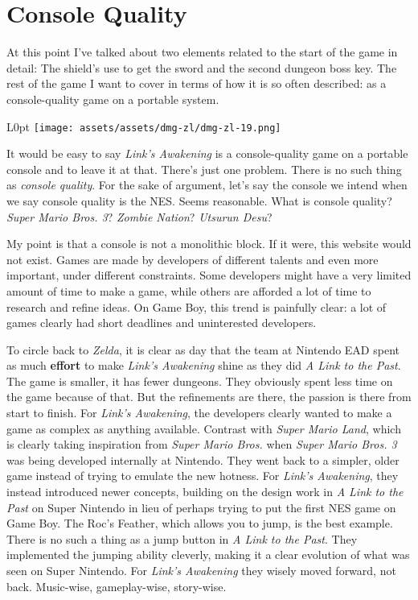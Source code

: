 \documentclass{book}
\begin{document}
\FloatBarrier\needspace{5pt}\section*{Console Quality}\nopagebreak[4]

At this point I’ve talked about two elements related to the start of the game in detail: The shield’s use to get the sword and the second dungeon boss key. The rest of the game I want to cover in terms of how it is so often described: as a console-quality game on a portable system.

\begin{wrapfigure}{L}{0pt} \texttt{[image: assets/assets/dmg-zl/dmg-zl-19.png]}\end{wrapfigure}
It would be easy to say \emph{Link’s Awakening} is a console-quality game on a portable console and to leave it at that. There’s just one problem. There is no such thing as \emph{console quality}. For the sake of argument, let’s say the console we intend when we say console quality is the NES. Seems reasonable. What is console quality? \emph{Super Mario Bros. 3}? \emph{Zombie Nation}? \emph{Utsurun Desu}?

My point is that a console is not a monolithic block. If it were, this website would not exist. Games are made by developers of different talents and even more important, under different constraints. Some developers might have a very limited amount of time to make a game, while others are afforded a lot of time to research and refine ideas. On Game Boy, this trend is painfully clear: a lot of games clearly had short deadlines and uninterested developers.

To circle back to \emph{Zelda}, it is clear as day that the team at Nintendo EAD spent as much \textbf{effort} to make \emph{Link’s Awakening} shine as they did \emph{A Link to the Past}. The game is smaller, it has fewer dungeons. They obviously spent less time on the game because of that. But the refinements are there, the passion is there from start to finish. For \emph{Link’s Awakening}, the developers clearly wanted to make a game as complex as anything available. Contrast with \emph{Super Mario Land}, which is clearly taking inspiration from \emph{Super Mario Bros.} when \emph{Super Mario Bros. 3} was being developed internally at Nintendo. They went back to a simpler, older game instead of trying to emulate the new hotness. For \emph{Link’s Awakening}, they instead introduced newer concepts, building on the design work in \emph{A Link to the Past} on Super Nintendo in lieu of perhaps trying to put the first NES game on Game Boy. The Roc’s Feather, which allows you to jump, is the best example. There is no such a thing as a jump button in \emph{A Link to the Past}. They implemented the jumping ability cleverly, making it a clear evolution of what was seen on Super Nintendo. For \emph{Link’s Awakening} they wisely moved forward, not back. Music-wise, gameplay-wise, story-wise.
\end{document}
